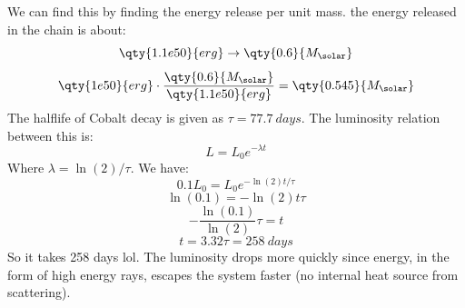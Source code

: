 
We can find this by finding the energy release per unit mass. the energy released in the chain is about:
\begin{equation}
    \qty{1.1e50}{erg} \rightarrow \qty{0.6}{M_\solar}
\end{equation}
\begin{equation}
    \qty{1e50}{erg}\cdot\frac{\qty{0.6}{M_\solar}}{\qty{1.1e50}{erg}} = \qty{0.545}{M_\solar}
\end{equation}
The halflife of Cobalt decay is given as $\tau = \qty{77.7}{days}$. The luminosity relation between this is:
\begin{equation}
    L = L_0 e^{-\lambda t}
\end{equation}
Where $\lambda = \ln(2)/\tau$. We have:
\begin{equation}
    0.1L_0 = L_0 e^{-\ln(2)t/\tau}
\end{equation}
\begin{equation}
    \ln(0.1) = -\ln(2)t\tau
\end{equation}
\begin{equation}
    -\frac{\ln(0.1)}{\ln(2)}\tau = t
\end{equation}
\begin{equation}
    t = 3.32\tau = \qty{258}{days}
\end{equation}
So it takes 258 days lol.
The luminosity drops more quickly since energy, in the form of high energy rays, escapes the system faster (no internal heat source from scattering).
